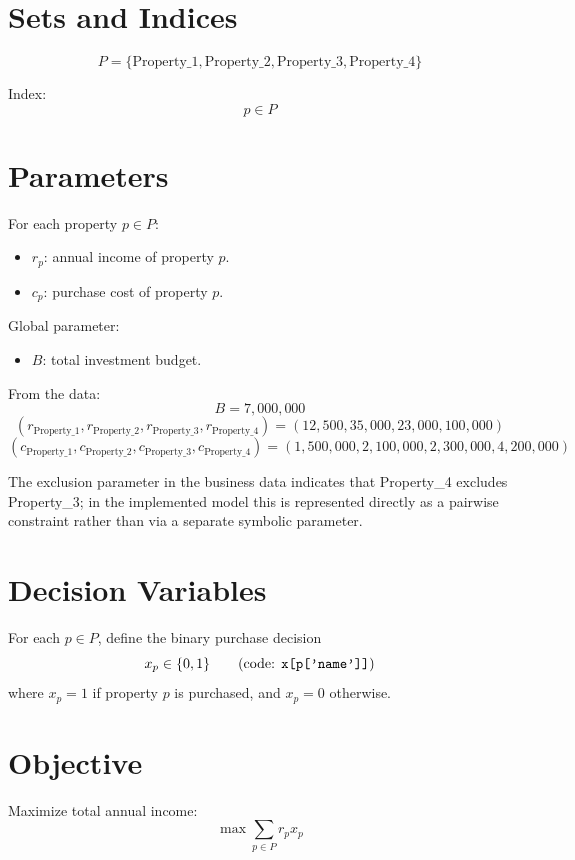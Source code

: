 \section*{Sets and Indices}

\[
P = \{\text{Property\_1},\text{Property\_2},\text{Property\_3},\text{Property\_4}\}
\]

Index:
\[
p \in P
\]

\section*{Parameters}

For each property \(p \in P\):
\begin{itemize}
    \item \(r_p\): annual income of property \(p\).
    \item \(c_p\): purchase cost of property \(p\).
\end{itemize}

Global parameter:
\begin{itemize}
    \item \(B\): total investment budget.
\end{itemize}

From the data:
\[
B = 7{,}000{,}000
\]
\[
(r_{\text{Property\_1}},r_{\text{Property\_2}},r_{\text{Property\_3}},r_{\text{Property\_4}})
=
(12{,}500,35{,}000,23{,}000,100{,}000)
\]
\[
(c_{\text{Property\_1}},c_{\text{Property\_2}},c_{\text{Property\_3}},c_{\text{Property\_4}})
=
(1{,}500{,}000,2{,}100{,}000,2{,}300{,}000,4{,}200{,}000)
\]

The exclusion parameter in the business data indicates that Property\_4 excludes Property\_3; in the implemented model this is represented directly as a pairwise constraint rather than via a separate symbolic parameter.

\section*{Decision Variables}

For each \(p \in P\), define the binary purchase decision
\[
x_p \in \{0,1\}
\qquad \text{(code: \texttt{x[p['name']]})}
\]
where \(x_p = 1\) if property \(p\) is purchased, and \(x_p = 0\) otherwise.

\section*{Objective}

Maximize total annual income:
\[
\max \sum_{p \in P} r_p x_p
\]

